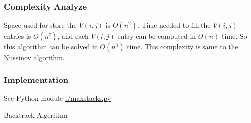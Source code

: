 \documentclass[10pt]{article}
\begin{document}
\noindent
\subsubsection{Complexity Analyze}
\label{ana:max_stack}

Space used for store the $V(i, j)$ is $O(n^2)$.
Time needed to fill the $V(i, j)$ entries is $O(n^2)$,
and each $V(i,j)$ entry can be computed in $O(n)$ time.
So this algorithm can be solved in $O(n^3)$ time.
This complexity is same to the Nussinov algorithm.

\subsubsection{Implementation}
See Python module \url{./maxstacks.py} \\

\pagebreak

\begin{algorithm}[H]
    \DontPrintSemicolon

    \BlankLine

     {
         {
            \Return
        }
         {
        }
         {
        }
    }

    \BlankLine

    \label{alg:backtrack1}
    \caption{Backtrack Algorithm}

\end{algorithm}
\end{document}
